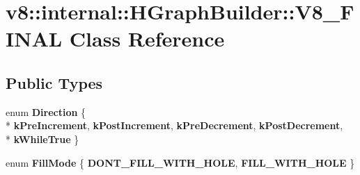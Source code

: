 \hypertarget{classv8_1_1internal_1_1_h_graph_builder_1_1_v8___f_i_n_a_l}{}\section{v8\+:\+:internal\+:\+:H\+Graph\+Builder\+:\+:V8\+\_\+\+F\+I\+N\+A\+L Class Reference}
\label{classv8_1_1internal_1_1_h_graph_builder_1_1_v8___f_i_n_a_l}
\subsection*{Public Types}
\begin{DoxyCompactItemize}
\item 
\hypertarget{classv8_1_1internal_1_1_h_graph_builder_1_1_v8___f_i_n_a_l_aa790793b7a23cd6b5551e488ec3238eb}{}enum {\bfseries Direction} \{ \\*
{\bfseries k\+Pre\+Increment}, 
{\bfseries k\+Post\+Increment}, 
{\bfseries k\+Pre\+Decrement}, 
{\bfseries k\+Post\+Decrement}, 
\\*
{\bfseries k\+While\+True}
 \}\label{classv8_1_1internal_1_1_h_graph_builder_1_1_v8___f_i_n_a_l_aa790793b7a23cd6b5551e488ec3238eb}

\item 
\hypertarget{classv8_1_1internal_1_1_h_graph_builder_1_1_v8___f_i_n_a_l_aa84e084616c273b8ac7d22a81aefec98}{}enum {\bfseries Fill\+Mode} \{ {\bfseries D\+O\+N\+T\+\_\+\+F\+I\+L\+L\+\_\+\+W\+I\+T\+H\+\_\+\+H\+O\+L\+E}, 
{\bfseries F\+I\+L\+L\+\_\+\+W\+I\+T\+H\+\_\+\+H\+O\+L\+E}
 \}\label{classv8_1_1internal_1_1_h_graph_builder_1_1_v8___f_i_n_a_l_aa84e084616c273b8ac7d22a81aefec98}

\end{DoxyCompactItemize}

